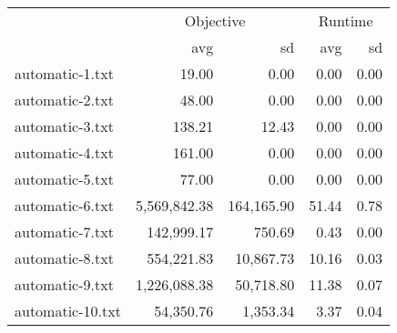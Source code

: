 \begin{tabular}{lrrrr}
  \toprule   & \multicolumn{2}{c}{Objective} & \multicolumn{2}{c}{Runtime} \\ & avg & sd & avg & sd \\ 
  \midrule automatic-1.txt & 19.00 & 0.00 & 0.00 & 0.00 \\ 
  automatic-2.txt & 48.00 & 0.00 & 0.00 & 0.00 \\ 
  automatic-3.txt & 138.21 & 12.43 & 0.00 & 0.00 \\ 
  automatic-4.txt & 161.00 & 0.00 & 0.00 & 0.00 \\ 
  automatic-5.txt & 77.00 & 0.00 & 0.00 & 0.00 \\ 
  automatic-6.txt & 5,569,842.38 & 164,165.90 & 51.44 & 0.78 \\ 
  automatic-7.txt & 142,999.17 & 750.69 & 0.43 & 0.00 \\ 
  automatic-8.txt & 554,221.83 & 10,867.73 & 10.16 & 0.03 \\ 
  automatic-9.txt & 1,226,088.38 & 50,718.80 & 11.38 & 0.07 \\ 
  automatic-10.txt & 54,350.76 & 1,353.34 & 3.37 & 0.04 \\ 
   \bottomrule \end{tabular}
